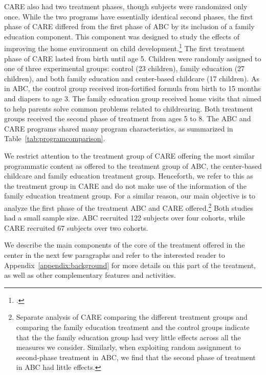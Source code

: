 CARE also had two treatment phases, though subjects were randomized only once. While the two programs have essentially identical second phases, the first phase of CARE differed from the first phase of ABC by its inclusion of a family education component. This component was designed to study the effects of improving the home environment on child development.\footnote{\citet{Wasik_Ramey_etal_1990_CD}.} The first treatment phase of CARE lasted from birth until age 5. Children were randomly assigned to one of three experimental groups: control (23 children), family education (27 children), and both family education and center-based childcare (17 children). As in ABC, the control group received iron-fortified formula from birth to 15 months and diapers to age 3. The family education group received home visits that aimed to help parents solve common problems related to childrearing. Both treatment groups received the second phase of treatment from ages 5 to 8. The ABC and CARE programs shared many program characteristics, as summarized in Table~\ref{tab:programcomparison}.

We restrict attention to the treatment group of CARE offering the most similar programmatic content as offered to the treatment group of ABC, the center-based childcare and family education treatment group. Henceforth, we refer to this as the treatment group in CARE and do not make use of the information of the family education treatment group. For a similar reason, our main objective is to analyze the first phase of the treatment ABC and CARE offered.\footnote{Separate analysis of CARE comparing the different treatment groups and comparing the family education treatment and the control groups indicate that the the family education group had very little effects across all the measures we consider. Similarly, when exploiting random assignment to second-phase treatment in ABC, we find that the second phase of treatment in ABC had little effects.} Both studies had a small sample size. ABC recruited 122 subjects over four cohorts, while CARE recruited 67 subjects over two cohorts.

We describe the main components of the core of the treatment offered in the center in the next few paragraphs and refer to the interested reader to Appendix~\ref{appendix:background} for more details on this part of the treatment, as well as other complementary features and activities.

\begin{center}

\end{center}

